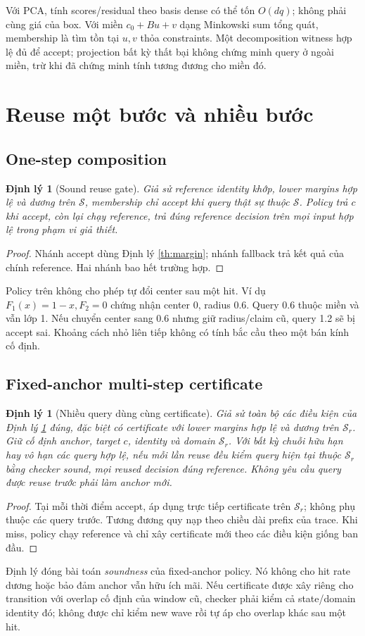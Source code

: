 \documentclass[11pt,a4paper]{article}
\newcommand{\Sset}{\mathcal S}
\newtheorem{theorem}[definition]{Định lý}
\theoremstyle{remark}
\begin{document}
Với PCA, tính scores/residual theo basis dense có thể tốn $O(dq)$; không
phải cùng giá của box. Với miền $c_0+Bu+v$ dạng Minkowski sum tổng quát,
membership là tìm tồn tại $u,v$ thỏa constraints. Một decomposition witness
hợp lệ đủ để accept; projection bất kỳ thất bại không chứng minh query ở
ngoài miền, trừ khi đã chứng minh tính tương đương cho miền đó.

\section{Reuse một bước và nhiều bước}
\subsection{One-step composition}
\begin{theorem}[Sound reuse gate]\label{th:gate}
Giả sử reference identity khớp, lower margins hợp lệ và dương trên $\Sset$,
membership chỉ accept khi query thật sự thuộc $\Sset$. Policy trả $c$ khi
accept, còn lại chạy reference, trả đúng reference decision trên mọi
input hợp lệ trong phạm vi giả thiết.
\end{theorem}
\begin{proof}
Nhánh accept dùng Định lý \ref{th:margin}; nhánh fallback trả kết quả của
chính reference. Hai nhánh bao hết trường hợp.
\end{proof}
Policy trên không cho phép tự đổi center sau một hit. Ví dụ
$F_1(x)=1-x,F_2=0$ chứng nhận center 0, radius 0.6. Query 0.6 thuộc miền
và vẫn lớp 1. Nếu chuyển center sang 0.6 nhưng giữ radius/claim cũ, query
1.2 sẽ bị accept sai. Khoảng cách nhỏ liên tiếp không có tính bắc cầu
theo một bán kính cố định.

\subsection{Fixed-anchor multi-step certificate}
\begin{theorem}[Nhiều query dùng cùng certificate]\label{th:fixed}
Giả sử toàn bộ các điều kiện của Định lý \ref{th:gate} đúng, đặc biệt có
certificate với lower margins hợp lệ và dương trên $\Sset_r$. Giữ cố định
anchor, target $c$, identity và domain $\Sset_r$. Với bất kỳ
chuỗi hữu hạn hay vô hạn các query hợp lệ, nếu mỗi lần reuse đều kiểm
query hiện tại thuộc $\Sset_r$ bằng checker sound, mọi reused decision đúng
reference. Không yêu cầu query được reuse trước phải làm anchor mới.
\end{theorem}
\begin{proof}
Tại mỗi thời điểm accept, áp dụng trực tiếp certificate trên $\Sset_r$;
không phụ thuộc các query trước. Tương đương quy nạp theo chiều dài prefix
của trace. Khi miss, policy chạy reference và chỉ xây certificate mới theo
các điều kiện giống ban đầu.
\end{proof}
Định lý đóng bài toán \emph{soundness} của fixed-anchor policy. Nó không
cho hit rate dương hoặc bảo đảm anchor vẫn hữu ích mãi. Nếu certificate
được xây riêng cho transition với overlap cố định của window cũ, checker
phải kiểm cả state/domain identity đó; không được chỉ kiểm new wave rồi
tự áp cho overlap khác sau một hit.
\end{document}
